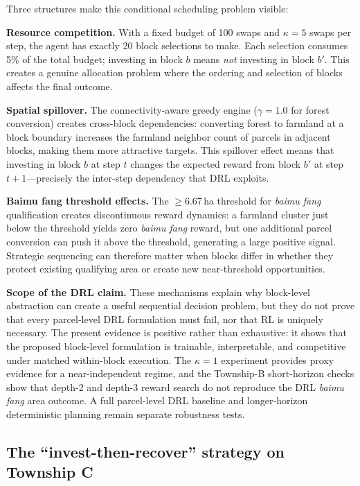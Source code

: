 \documentclass[preprint,12pt]{elsarticle}
\begin{document}
Three structures make this conditional scheduling problem visible:

\textbf{Resource competition.} With a fixed budget of 100 swaps and $\kappa = 5$ swaps per step, the agent has exactly 20 block selections to make. Each selection consumes 5\% of the total budget; investing in block $b$ means \textit{not} investing in block $b'$. This creates a genuine allocation problem where the ordering and selection of blocks affects the final outcome.

\textbf{Spatial spillover.} The connectivity-aware greedy engine ($\gamma = 1.0$ for forest conversion) creates cross-block dependencies: converting forest to farmland at a block boundary increases the farmland neighbor count of parcels in adjacent blocks, making them more attractive targets. This spillover effect means that investing in block $b$ at step $t$ changes the expected reward from block $b'$ at step $t+1$---precisely the inter-step dependency that DRL exploits.

\textbf{Baimu fang threshold effects.} The $\geq$6.67\,ha threshold for \textit{baimu fang} qualification creates discontinuous reward dynamics: a farmland cluster just below the threshold yields zero \textit{baimu fang} reward, but one additional parcel conversion can push it above the threshold, generating a large positive signal. Strategic sequencing can therefore matter when blocks differ in whether they protect existing qualifying area or create new near-threshold opportunities.

\textbf{Scope of the DRL claim.} These mechanisms explain why block-level abstraction can create a useful sequential decision problem, but they do not prove that every parcel-level DRL formulation must fail, nor that RL is uniquely necessary. The present evidence is positive rather than exhaustive: it shows that the proposed block-level formulation is trainable, interpretable, and competitive under matched within-block execution. The $\kappa=1$ experiment provides proxy evidence for a near-independent regime, and the Township-B short-horizon checks show that depth-2 and depth-3 reward search do not reproduce the DRL \textit{baimu fang} area outcome. A full parcel-level DRL baseline and longer-horizon deterministic planning remain separate robustness tests.

\subsection{The ``invest-then-recover'' strategy on Township C}
\end{document}

